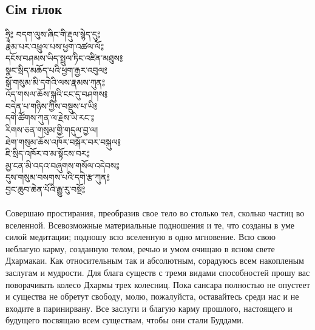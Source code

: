\subsection{Сім гілок}
\vspace{0.8cm}
\ti
ཧྲཱི༔ བདག་ལུས་ཞིང་གི་རྡུལ་སྙེད་དུ༔\\
རྣམ་པར་འཕྲུལ་པས་ཕྱག་འཚལ་ལོ༔\\
དངོས་བཤམས་ཡིད་སྤྲུལ་ཏིང་འཛིན་མཐུས༔\\
སྣང་སྲིད་མཆོད་པའི་ཕྱག་རྒྱར་འབུལ༔\\
སྒོ་གསུམ་མི་དགེའི་ལས་རྣམས་ཀུན༔\\
འོད་གསལ་ཆོས་སྐུའི་ངང་དུ་བཤགས༔\\
བདེན་པ་གཉིས་ཀྱིས་བསྡུས་པ་ཡི༔\\
དགེ་ཚོགས་ཀུན་ལ་རྗེས་ཡི་རང་༔\\
རིགས་ཅན་གསུམ་གྱི་གདུལ་བྱ་ལ།\\
ཐེག་གསུམ་ཆོས་འཁོར་བསྐོར་བར་བསྐུལ༔\\
ཇི་སྲིད་འཁོར་བ་མ་སྟོངས་བར༔ \\
མྱ་ངན་མི་འདའ་བཞུགས་གསོལ་འདེབས༔ \\
དུས་གསུམ་བསགས་པའི་དགེ་རྩ་ཀུན༔ \\
བྱང་ཆུབ་ཆེན་པོའི་རྒྱུ་རུ་བསྔོ༔ \\
\\
\ru
Совершаю простирания, преобразив свое тело во столько тел, сколько частиц во вселенной.
Всевозможные материаль\-ные подношения и те, что созданы в уме силой медитации;
подношу всю вселенную в одно мгновение.
Всю свою неблагую карму, созданную телом, речью и умом очищаю в ясном свете Дхармакаи.
Как относительным так и абсолютным, сорадуюсь всем накопленым заслугам и мудрости.
Для блага существ с тремя видами способностей прошу вас  поворачивать колесо Дхармы трех колесниц.
Пока сансара полностью не опустеет и существа не обретут свободу,
молю, пожалуйста, оставайтесь среди нас и не входите в паринирвану.
Все заслуги и благую карму прошлого, настоящего и будущего
посвящаю всем существам, чтобы они стали Буддами.
\newpage
